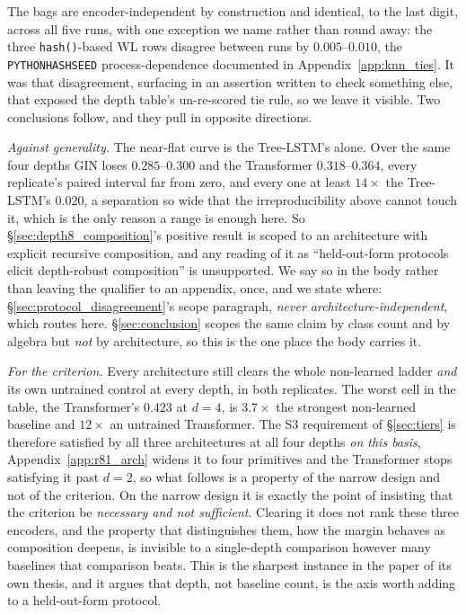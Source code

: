 The bags are encoder-independent by construction and identical, to the last digit, across all five runs, with one exception we name rather than round away: the three \texttt{hash()}-based WL rows disagree between runs by $0.005$--$0.010$, the \texttt{PYTHONHASHSEED} process-dependence documented in Appendix~\ref{app:knn_ties}. It was that disagreement, surfacing in an assertion written to check something else, that exposed the depth table's un-re-scored tie rule, so we leave it visible. Two conclusions follow, and they pull in opposite directions.

\emph{Against generality.} The near-flat curve is the Tree-LSTM's alone. Over the same four depths GIN loses $0.285$--$0.300$ and the Transformer $0.318$--$0.364$, every replicate's paired interval far from zero, and every one at least $14\times$ the Tree-LSTM's $0.020$, a separation so wide that the irreproducibility above cannot touch it, which is the only reason a range is enough here. So \S\ref{sec:depth8_composition}'s positive result is scoped to an architecture with explicit recursive composition, and any reading of it as ``held-out-form protocols elicit depth-robust composition'' is unsupported. We say so in the body rather than leaving the qualifier to an appendix, once, and we state where: \S\ref{sec:protocol_disagreement}'s scope paragraph, \emph{never architecture-independent}, which routes here. \S\ref{sec:conclusion} scopes the same claim by class count and by algebra but \emph{not} by architecture, so this is the one place the body carries it.

\emph{For the criterion.} Every architecture still clears the whole non-learned ladder \emph{and} its own untrained control at every depth, in both replicates. The worst cell in the table, the Transformer's $0.423$ at $d{=}4$, is $3.7\times$ the strongest non-learned baseline and $12\times$ an untrained Transformer. The S3 requirement of \S\ref{sec:tiers} is therefore satisfied by all three architectures at all four depths \emph{on this basis}, Appendix~\ref{app:r81_arch} widens it to four primitives and the Transformer stops satisfying it past $d{=}2$, so what follows is a property of the narrow design and not of the criterion. On the narrow design it is exactly the point of insisting that the criterion be \emph{necessary and not sufficient}. Clearing it does not rank these three encoders, and the property that distinguishes them, how the margin behaves as composition deepens, is invisible to a single-depth comparison however many baselines that comparison beats. This is the sharpest instance in the paper of its own thesis, and it argues that depth, not baseline count, is the axis worth adding to a held-out-form protocol.

